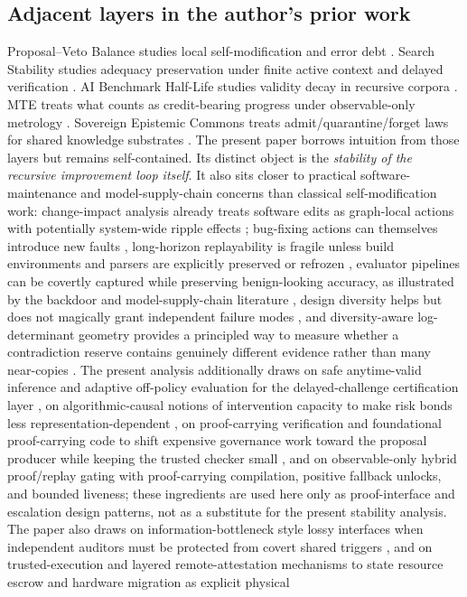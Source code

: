 \documentclass[11pt]{article}
\theoremstyle{definition}
\newcommand{\1}{\mathbf{1}}
\begin{document}
\subsection{Adjacent layers in the author's prior work}
Proposal--Veto Balance studies local self-modification and error debt \cite{TakahashiPV2026}. Search Stability studies adequacy preservation under finite active context and delayed verification \cite{TakahashiSearch2026}. AI Benchmark Half-Life studies validity decay in recursive corpora \cite{TakahashiBH2026}. MTE treats what counts as credit-bearing progress under observable-only metrology \cite{TakahashiMTE2026}. Sovereign Epistemic Commons treats admit/quarantine/forget laws for shared knowledge substrates \cite{TakahashiSEC2026}. The present paper borrows intuition from those layers but remains self-contained. Its distinct object is the \emph{stability of the recursive improvement loop itself}. It also sits closer to practical software-maintenance and model-supply-chain concerns than classical self-modification work: change-impact analysis already treats software edits as graph-local actions with potentially system-wide ripple effects \cite{AcharyaRobinson2011,PalmskogCelikGligoric2020}; bug-fixing actions can themselves introduce new faults \cite{Yin2011IncorrectFixes,MaesBermejo2024}, long-horizon replayability is fragile unless build environments and parsers are explicitly preserved or refrozen \cite{Matthews2010Preservation,Butler2023RB,Malka2024SpaceTime,Perkel2020TenYear,DiCosmoZacchiroli2017}, evaluator pipelines can be covertly captured while preserving benign-looking accuracy, as illustrated by the backdoor and model-supply-chain literature \cite{Gu2019BadNets,Li2024BackdoorSurvey}, design diversity helps but does not magically grant independent failure modes \cite{Avizienis1985,KnightLeveson1986}, and diversity-aware log-determinant geometry provides a principled way to measure whether a contradiction reserve contains genuinely different evidence rather than many near-copies \cite{KuleszaTaskar2012}. The present analysis additionally draws on safe anytime-valid inference and adaptive off-policy evaluation for the delayed-challenge certification layer \cite{HowardRamdasMcAuliffeSekhon2021,RamdasGrunwaldVovkShafer2023,ZhanHadadHirshbergAthey2021,WassermanRamdasBalakrishnan2020}, on algorithmic-causal notions of intervention capacity to make risk bonds less representation-dependent \cite{Pearl2009,JanzingSchoelkopf2010}, on proof-carrying verification and foundational proof-carrying code to shift expensive governance work toward the proposal producer while keeping the trusted checker small \cite{Necula1997,Appel2001}, and on observable-only hybrid proof/replay gating with proof-carrying compilation, positive fallback unlocks, and bounded liveness; these ingredients are used here only as proof-interface and escalation design patterns, not as a substitute for the present stability analysis. The paper also draws on information-bottleneck style lossy interfaces when independent auditors must be protected from covert shared triggers \cite{Tishby1999,CoverThomas2006}, and on trusted-execution and layered remote-attestation mechanisms to state resource escrow and hardware migration as explicit physical 
\end{document}
